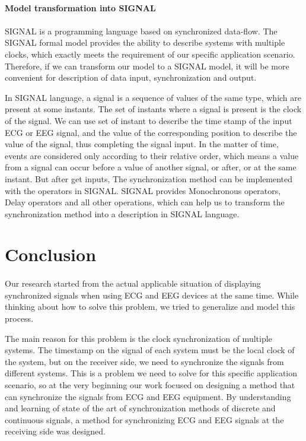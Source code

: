 \documentclass{article}
\begin{document}
\paragraph{Model transformation into SIGNAL}

\paragraph{}

SIGNAL is a programming language based on synchronized data-flow\cite{ref10}. The SIGNAL formal model provides the ability to describe systems with multiple clocks, which exactly meets the requirement of our specific application scenario. Therefore, if we can transform our model to a SIGNAL model, it will be more convenient for description of data input, synchronization and output.

In SIGNAL language, a signal is a sequence of values of the same type, which are present at some instants. The set of instants where a signal is present is the clock of the signal. We can use set of instant to describe the time stamp of the input ECG or EEG signal, and the value of the corresponding position to describe the value of the signal, thus completing the signal input. In the matter of time, events are considered only according to their relative order, which means a value from a signal can occur before a value of another signal, or after, or at the same instant. But after get inputs, The synchronization method can be implemented with the operators in SIGNAL. SIGNAL provides Monochronous operators, Delay operators and all other operations, which can help us to transform the synchronization method into a description in SIGNAL language.

\section{Conclusion}

\paragraph{}

Our research started from the actual applicable situation of displaying synchronized signals when using ECG and EEG devices at the same time. While thinking about how to solve this problem, we tried to generalize and model this process.

The main reason for this problem is the clock synchronization of multiple systems. The timestamp on the signal of each system must be the local clock of the system, but on the receiver side, we need to synchronize the signals from different systems. This is a problem we need to solve for this specific application scenario, so at the very beginning our work focused on designing a method that can synchronize the signals from ECG and EEG equipment. By understanding and learning of state of the art of synchronization methods of discrete and continuous signals, a method for synchronizing ECG and EEG signals at the receiving side was designed.
\end{document}

